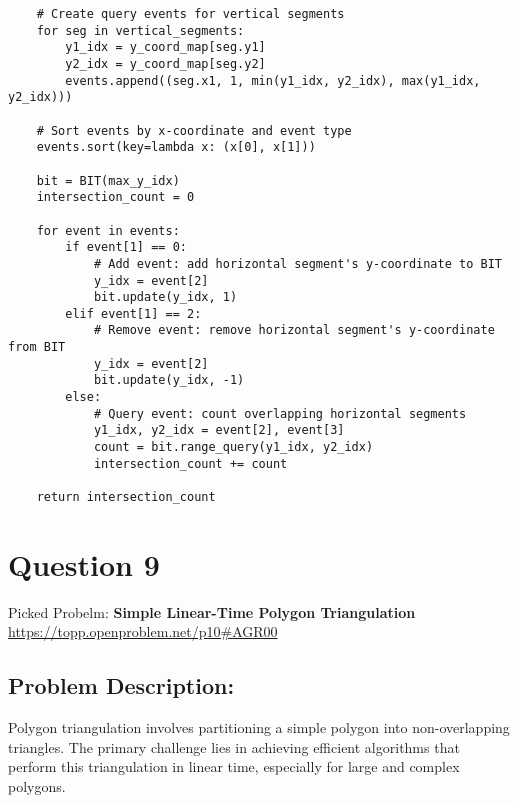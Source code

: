 \documentclass{article}
\begin{document}
\begin{verbatim}
    # Create query events for vertical segments
    for seg in vertical_segments:
        y1_idx = y_coord_map[seg.y1]
        y2_idx = y_coord_map[seg.y2]
        events.append((seg.x1, 1, min(y1_idx, y2_idx), max(y1_idx, y2_idx)))

    # Sort events by x-coordinate and event type
    events.sort(key=lambda x: (x[0], x[1]))

    bit = BIT(max_y_idx)
    intersection_count = 0

    for event in events:
        if event[1] == 0:
            # Add event: add horizontal segment's y-coordinate to BIT
            y_idx = event[2]
            bit.update(y_idx, 1)
        elif event[1] == 2:
            # Remove event: remove horizontal segment's y-coordinate from BIT
            y_idx = event[2]
            bit.update(y_idx, -1)
        else:
            # Query event: count overlapping horizontal segments
            y1_idx, y2_idx = event[2], event[3]
            count = bit.range_query(y1_idx, y2_idx)
            intersection_count += count

    return intersection_count
\end{verbatim}

\newpage

\section*{Question 9}
Picked Probelm: \textbf{Simple Linear-Time Polygon Triangulation} 
\\
\url{https://topp.openproblem.net/p10#AGR00}

\subsection*{Problem Description:}
Polygon triangulation involves partitioning a simple polygon into non-overlapping triangles.
The primary challenge lies in achieving efficient algorithms that perform this triangulation in linear time, especially for large and complex polygons.
\end{document}
